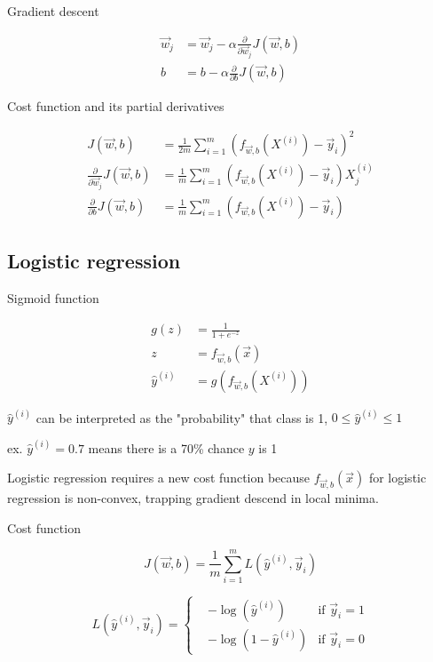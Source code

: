 \documentclass[12pt]{article}
\begin{document}
Gradient descent

\begin{align*}
    \vec{w}_j &= \vec{w}_j - \alpha \frac{\partial}{\partial \vec{w}_j} J(\vec{w},b)\\
    b &= b - \alpha \frac{\partial}{\partial b} J(\vec{w},b)
\end{align*}

Cost function and its partial derivatives

\begin{align*}
    J(\vec{w},b) &= \frac{1}{2m} \sum_{i=1}^{m} (f_{\vec{w},b}(X^{(i)}) - \vec{y}_i)^2\\
    \frac{\partial}{\partial \vec{w}_j} J(\vec{w},b) &= \frac{1}{m} \sum_{i=1}^{m} (f_{\vec{w},b}(X^{(i)}) - \vec{y}_i) X_j^{(i)}\\
    \frac{\partial}{\partial b} J(\vec{w},b) &= \frac{1}{m} \sum_{i=1}^{m} (f_{\vec{w},b}(X^{(i)}) - \vec{y}_i)
\end{align*}

\subsection{Logistic regression}

Sigmoid function

\begin{align*}
    g(z) &= \frac{1}{1 + e^{-z}}\\
    z &= f_{\vec{w},b}(\vec{x})\\
    \hat{y}^{(i)} &= g(f_{\vec{w},b}(X^{(i)}))
\end{align*}

$\hat{y}^{(i)}$ can be interpreted as the "probability" that class is 1, $0 \leq \hat{y}^{(i)} \leq 1$

ex. $\hat{y}^{(i)} = 0.7$ means there is a 70\% chance $y$ is 1

Logistic regression requires a new cost function because $f_{\vec{w},b}(\vec{x})$ for logistic regression is non-convex, trapping gradient descend in local minima.

Cost function

\[ J(\vec{w},b) = \frac{1}{m} \sum_{i=1}^{m} L(\hat{y}^{(i)},\vec{y}_i) \]

\begin{equation*}
L(\hat{y}^{(i)},\vec{y}_i) = 
  \left\{
    \begin{aligned}
      & -\log(\hat{y}^{(i)}) & \text{if } \vec{y}_i = 1 \\
      & -\log(1 - \hat{y}^{(i)}) & \text{if } \vec{y}_i = 0
    \end{aligned}
  \right.
\end{equation*}
\end{document}
